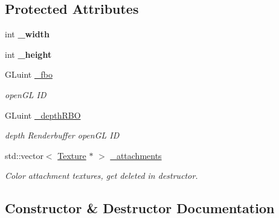 \subsection*{Protected Attributes}
\begin{DoxyCompactItemize}
\item 
\hypertarget{class_framebuffer_af27bf1f68f7da2b7b3c48190356245bc}{}int {\bfseries \+\_\+width}\label{class_framebuffer_af27bf1f68f7da2b7b3c48190356245bc}

\item 
\hypertarget{class_framebuffer_a63e2b3d16786239f6f2342733fc3b722}{}int {\bfseries \+\_\+height}\label{class_framebuffer_a63e2b3d16786239f6f2342733fc3b722}

\item 
\hypertarget{class_framebuffer_a542d8261ea8a78ac2777e7bfdedaaaab}{}G\+Luint \hyperlink{class_framebuffer_a542d8261ea8a78ac2777e7bfdedaaaab}{\+\_\+fbo}\label{class_framebuffer_a542d8261ea8a78ac2777e7bfdedaaaab}

\begin{DoxyCompactList}\small\item\em open\+G\+L I\+D \end{DoxyCompactList}\item 
\hypertarget{class_framebuffer_adfd7fb74d3dd0fac749000c5c888c6a6}{}G\+Luint \hyperlink{class_framebuffer_adfd7fb74d3dd0fac749000c5c888c6a6}{\+\_\+depth\+R\+B\+O}\label{class_framebuffer_adfd7fb74d3dd0fac749000c5c888c6a6}

\begin{DoxyCompactList}\small\item\em depth Renderbuffer open\+G\+L I\+D \end{DoxyCompactList}\item 
\hypertarget{class_framebuffer_ae2d9ec57440ab3201da60ff8f4f5f09a}{}std\+::vector$<$ \hyperlink{class_texture}{Texture} $\ast$ $>$ \hyperlink{class_framebuffer_ae2d9ec57440ab3201da60ff8f4f5f09a}{\+\_\+attachments}\label{class_framebuffer_ae2d9ec57440ab3201da60ff8f4f5f09a}

\begin{DoxyCompactList}\small\item\em Color attachment textures, get deleted in destructor. \end{DoxyCompactList}\end{DoxyCompactItemize}


\subsection{Constructor \& Destructor Documentation}
\hypertarget{class_framebuffer_a4f10f2020d414add1ea0e6553908c86b}{}
